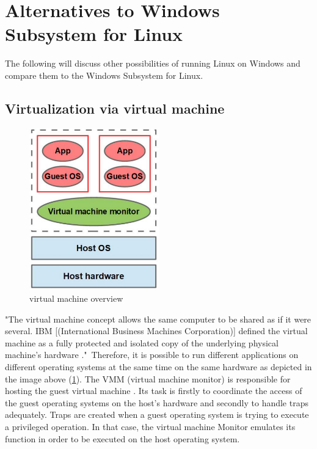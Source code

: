\documentclass[utf8,biblatex, ngerman, english]{lni}
\begin{document}
\section{Alternatives to Windows Subsystem for Linux}
The following will discuss other possibilities of running Linux on Windows and compare them to the Windows Subsystem for Linux.

\subsection{Virtualization via virtual machine}

\begin{figure}
  \centering
  \includegraphics[width=0.5\textwidth]{VM.pdf}
  \caption{virtual machine overview}
  \label{img:vm}
\end{figure}


"The virtual machine concept allows the same computer to be shared as if it were several. IBM [(International Business Machines Corporation)] defined the virtual machine as a fully protected and isolated copy of the underlying physical machine’s hardware \cite[p. 2]{Ro01}."\ 
Therefore, it is possible to run different applications on different operating systems at the same time on the same hardware as depicted in the image above (\ref{img:vm}). The VMM (virtual machine monitor) is responsible for hosting the guest virtual machine \cite[p. 3]{Ro01}. Its task is firstly to coordinate the access of the guest operating systems on the host's hardware and secondly to handle traps adequately. Traps are created when a guest operating system is trying to execute a privileged operation. In that case, the virtual machine Monitor emulates its function in order to be executed on the host operating system.
\end{document}
